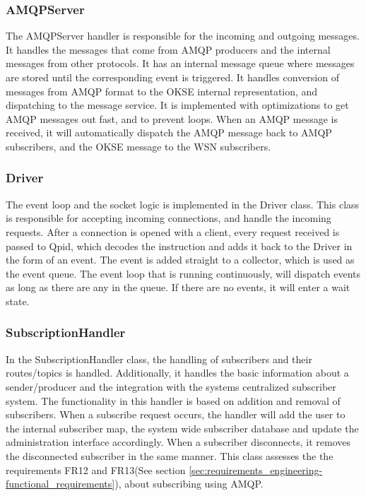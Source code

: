 \subsubsection{AMQPServer}
The AMQPServer handler is responsible for the incoming and outgoing messages. It handles the messages that come from AMQP producers and the internal messages from other protocols. It has an internal message queue where messages are stored until the corresponding event is triggered. It handles conversion of messages from AMQP format to the OKSE internal representation, and dispatching to the message service. It is implemented with optimizations to get AMQP messages out fast, and to prevent loops. When an AMQP message is received, it will automatically dispatch the AMQP message back to AMQP subscribers, and the OKSE message to the WSN subscribers.

\subsubsection{Driver}
The event loop and the socket logic is implemented in the Driver class. This class is responsible for accepting incoming connections, and handle the incoming requests. After a connection is opened with a client, every request received is passed to Qpid, which decodes the instruction and adds it back to the Driver in the form of an event. The event is added straight to a collector, which is used as the event queue. The event loop that is running continuously, will dispatch events as long as there are any in the queue. If there are no events, it will enter a wait state.

\subsubsection{SubscriptionHandler}
In the SubscriptionHandler class, the handling of subscribers and their routes/topics is handled. Additionally, it handles the basic information about a sender/producer and the integration with the systems centralized subscriber system. The functionality in this handler is based on addition and removal of subscribers. When a subscribe request occurs, the handler will add the user to the internal subscriber map, the system wide subscriber database and update the administration interface accordingly. When a subscriber disconnects, it removes the disconnected subscriber in the same manner. This class assesses the the requirements FR12 and FR13(See section \ref{sec:requirements_engineering-functional_requirements}), about subscribing using AMQP.


